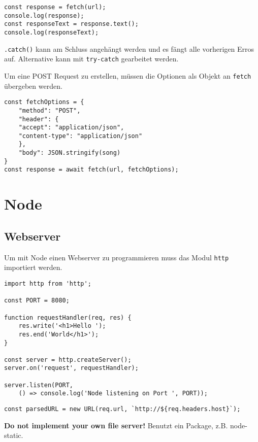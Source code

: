 \documentclass[11pt,twoside,landscape]{article}
\begin{document}
\begin{multicols}{4}
\lstset{language=js,label= ,caption= ,captionpos=b,numbers=none}
\begin{lstlisting}
const response = fetch(url);
console.log(response);
const responseText = response.text();
console.log(responseText);
\end{lstlisting}

\texttt{.catch()} kann am Schluss angehängt werden und es fängt alle vorherigen Erros auf. Alternative kann mit \texttt{try-catch} gearbeitet werden.

Um eine POST Request zu erstellen, müssen die Optionen als Objekt an \texttt{fetch} übergeben werden.
\lstset{language=js,label= ,caption= ,captionpos=b,numbers=none}
\begin{lstlisting}
const fetchOptions = {
    "method": "POST",
    "header": {
	"accept": "application/json",
	"content-type": "application/json"
    },
    "body": JSON.stringify(song)
}
const response = await fetch(url, fetchOptions);
\end{lstlisting}

\section{Node}
\label{sec:org53e389a}
\subsection{Webserver}
\label{sec:org43e094d}
Um mit Node einen Webserver zu programmieren muss das Modul \texttt{http} importiert werden.

\lstset{language=js,label= ,caption= ,captionpos=b,numbers=none}
\begin{lstlisting}
import http from 'http';

const PORT = 8080;

function requestHandler(req, res) {
    res.write('<h1>Hello ');
    res.end('World</h1>');
}

const server = http.createServer();
server.on('request', requestHandler);

server.listen(PORT,
	() => console.log('Node listening on Port ', PORT));
\end{lstlisting}

\lstset{language=js,label= ,caption= ,captionpos=b,numbers=none}
\begin{lstlisting}
const parsedURL = new URL(req.url, `http://${req.headers.host}`);
\end{lstlisting}

\textbf{Do not implement your own file server!} Benutzt ein Package, z.B. node-static.



\end{multicols}
\end{document}
